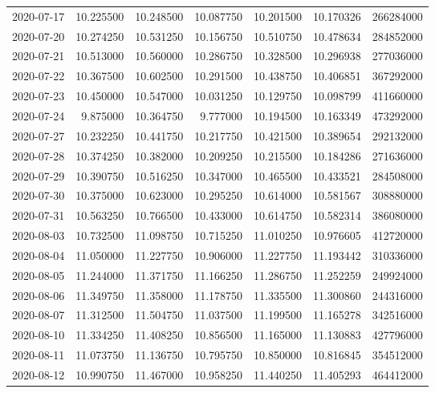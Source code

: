 \begin{tabular}{lrrrrrr}
2020-07-17 &   10.225500 &   10.248500 &   10.087750 &   10.201500 &   10.170326 &   266284000 \\
2020-07-20 &   10.274250 &   10.531250 &   10.156750 &   10.510750 &   10.478634 &   284852000 \\
2020-07-21 &   10.513000 &   10.560000 &   10.286750 &   10.328500 &   10.296938 &   277036000 \\
2020-07-22 &   10.367500 &   10.602500 &   10.291500 &   10.438750 &   10.406851 &   367292000 \\
2020-07-23 &   10.450000 &   10.547000 &   10.031250 &   10.129750 &   10.098799 &   411660000 \\
2020-07-24 &    9.875000 &   10.364750 &    9.777000 &   10.194500 &   10.163349 &   473292000 \\
2020-07-27 &   10.232250 &   10.441750 &   10.217750 &   10.421500 &   10.389654 &   292132000 \\
2020-07-28 &   10.374250 &   10.382000 &   10.209250 &   10.215500 &   10.184286 &   271636000 \\
2020-07-29 &   10.390750 &   10.516250 &   10.347000 &   10.465500 &   10.433521 &   284508000 \\
2020-07-30 &   10.375000 &   10.623000 &   10.295250 &   10.614000 &   10.581567 &   308880000 \\
2020-07-31 &   10.563250 &   10.766500 &   10.433000 &   10.614750 &   10.582314 &   386080000 \\
2020-08-03 &   10.732500 &   11.098750 &   10.715250 &   11.010250 &   10.976605 &   412720000 \\
2020-08-04 &   11.050000 &   11.227750 &   10.906000 &   11.227750 &   11.193442 &   310336000 \\
2020-08-05 &   11.244000 &   11.371750 &   11.166250 &   11.286750 &   11.252259 &   249924000 \\
2020-08-06 &   11.349750 &   11.358000 &   11.178750 &   11.335500 &   11.300860 &   244316000 \\
2020-08-07 &   11.312500 &   11.504750 &   11.037500 &   11.199500 &   11.165278 &   342516000 \\
2020-08-10 &   11.334250 &   11.408250 &   10.856500 &   11.165000 &   11.130883 &   427796000 \\
2020-08-11 &   11.073750 &   11.136750 &   10.795750 &   10.850000 &   10.816845 &   354512000 \\
2020-08-12 &   10.990750 &   11.467000 &   10.958250 &   11.440250 &   11.405293 &   464412000 \\

\end{tabular}
